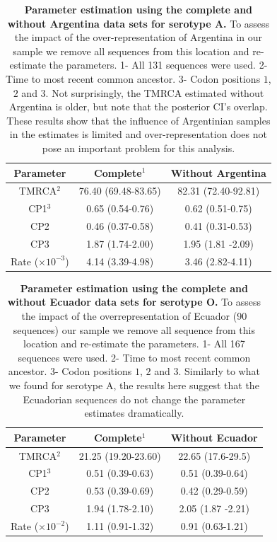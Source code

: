 \documentclass[a4paper,10pt]{article}
\begin{document}
\begin{table}[h]
\caption{ {{\bf Parameter estimation using the complete and without Argentina data sets for serotype A.}} 
To assess the impact of the over-representation of Argentina in our sample we remove all sequences from this location and re-estimate the parameters.
1- All 131 sequences were used. 2- Time to most recent common ancestor. 3- Codon positions $1$, $2$ and $3$.
Not surprisingly, the TMRCA estimated without Argentina is older, but note that the posterior CI's overlap.
These results show that the influence of Argentinian samples in the estimates is limited and over-representation does not pose an important problem for this analysis.}
\begin{center}
\begin{tabular}{ccc}
\toprule
Parameter	&Complete$^{1}$	& Without Argentina\\
\midrule
TMRCA$^{2}$	&76.40 (69.48-83.65)	&82.31 (72.40-92.81)\\
CP1$	^{3}$	&0.65 (0.54-0.76)	&0.62 (0.51-0.75)\\
CP2	&0.46 (0.37-0.58)	&0.41 (0.31-0.53)\\
CP3	&1.87 (1.74-2.00)	& 1.95 (1.81 -2.09)\\
Rate ($\times 10^{-3}$)	&4.14 (3.39-4.98)	&3.46 (2.82-4.11)\\
\bottomrule
\end{tabular}
\end{center}
\label{stab:SB_A}
 \end{table}
\begin{table}[h]
\caption{ {{\bf Parameter estimation using the complete and without Ecuador data sets for serotype O.}} 
To assess the impact of the overrepresentation of Ecuador (90 sequences) our sample we remove all sequence from this location and re-estimate the parameters.
1- All 167 sequences were used. 2- Time to most recent common ancestor. 3- Codon positions $1$, $2$ and $3$.
Similarly to what we found for serotype A, the results here suggest that the Ecuadorian sequences do not change the parameter estimates dramatically.}
\begin{center}
\begin{tabular}{ccc}
\toprule
Parameter	&Complete$^{1}$	&Without Ecuador\\
\midrule
TMRCA$^{2}$ & 21.25 (19.20-23.60) &22.65 (17.6-29.5)\\
CP1$^{3}$ & 0.51 (0.39-0.63) &0.51 (0.39-0.64)\\
CP2  &0.53 (0.39-0.69) & 0.42 (0.29-0.59)\\
CP3 &1.94 (1.78-2.10) & 2.05 (1.87 -2.21)\\
Rate ($\times 10^{-2}$)	&1.11 (0.91-1.32)&0.91 (0.63-1.21)\\
\bottomrule
\end{tabular}
\end{center}
\label{stab:SB_O}
 \end{table}
\end{document}
